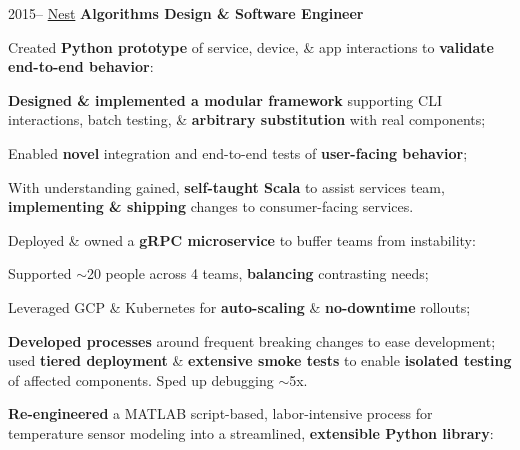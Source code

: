 \documentclass[]{friggeri-cv}
\begin{document}
\begin{entrylist}
  \entry
    {2015--}
    {\href{http://nest.com}{Nest}}
    {\textbf{Algorithms Design \& Software Engineer}}
    {
      \bodyspace
      \begin{my-itemize}
        \item Created \textbf{Python prototype} of service, device, \& app interactions to \textbf{validate end-to-end behavior}:
        \begin{my-itemize}
          \item \textbf{Designed \& implemented a modular framework} supporting CLI interactions, batch testing, \& \textbf{arbitrary substitution} with real components;
          \item Enabled \textbf{novel} integration and end-to-end tests of \textbf{user-facing behavior};
          \item With understanding gained, \textbf{self-taught Scala} to assist services team, \textbf{implementing \& shipping} changes to consumer-facing services.
        \end{my-itemize}
        \item Deployed \& owned a \textbf{gRPC microservice} to buffer teams from instability:
      
        \begin{my-itemize}
          \item Supported $\sim$20 people across 4 teams, \textbf{balancing} contrasting needs;
          \item Leveraged GCP \& Kubernetes for \textbf{auto-scaling} \& \textbf{no-downtime} rollouts;
          \item \textbf{Developed processes} around frequent breaking changes to ease development; used \textbf{tiered deployment} \& \textbf{extensive smoke tests} to enable \textbf{isolated testing} of affected components. Sped up debugging $\sim$5x.
        \end{my-itemize}
      
        \item \textbf{Re-engineered} a MATLAB script-based, labor-intensive process for temperature sensor modeling into a streamlined, \textbf{extensible Python library}:


\end{my-itemize}}
\end{entrylist}
\end{document}
